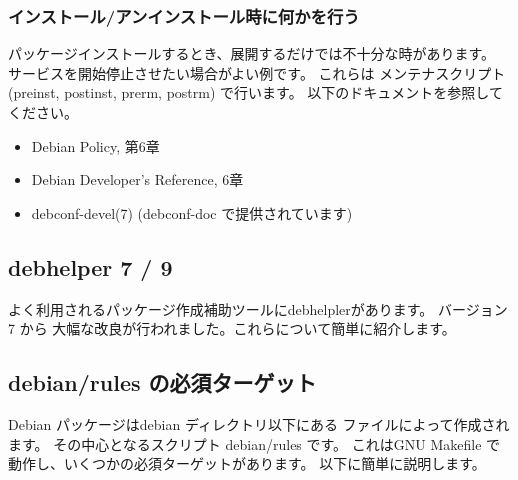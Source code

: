 \documentclass[mingoth,a4paper]{jsarticle}
\begin{document}

\subsubsection{インストール/アンインストール時に何かを行う}

パッケージインストールするとき、展開するだけでは不十分な時があります。
サービスを開始停止させたい場合がよい例です。
これらは メンテナスクリプト (preinst, postinst, prerm, postrm) で行います。
以下のドキュメントを参照してください。
\begin{itemize}
\item Debian Policy, 第6章
\item Debian Developer’s Reference,  6章
\item debconf-devel(7) (debconf-doc で提供されています)
\end{itemize}

\fi


\subsection{debhelper 7 / 9}
よく利用されるパッケージ作成補助ツールにdebhelplerがあります。 バージョン7 から
大幅な改良が行われました。これらについて簡単に紹介します。

\subsection{debian/rules の必須ターゲット}

Debian パッケージはdebian ディレクトリ以下にある ファイルによって作成されます。
その中心となるスクリプト debian/rules です。
これはGNU Makefile で動作し、いくつかの必須ターゲットがあります。
以下に簡単に説明します。
\end{document}
